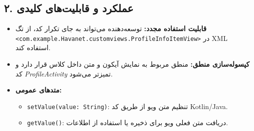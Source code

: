 \documentclass{report}
\begin{document}
\subsection*{۲. عملکرد و قابلیت‌های کلیدی}
\begin{itemize}
	\item \textbf{قابلیت استفاده مجدد:} توسعه‌دهنده می‌تواند به جای تکرار کد، از تگ 
	\texttt{<com.example.Havanet.customviews.ProfileInfoItemView>} در XML استفاده کند.
	\item \textbf{کپسوله‌سازی منطق:} منطق مربوط به نمایش آیکون و متن داخل کلاس قرار دارد و کد \textit{ProfileActivity} تمیزتر می‌شود.
	\item \textbf{متدهای عمومی:}
	\begin{itemize}
		\item \texttt{setValue(value: String)}: تنظیم متن ویو از طریق کد Kotlin/Java.
		\item \texttt{getValue()}: دریافت متن فعلی ویو برای ذخیره یا استفاده از اطلاعات.
	\end{itemize}
\end{itemize}
\end{document}
